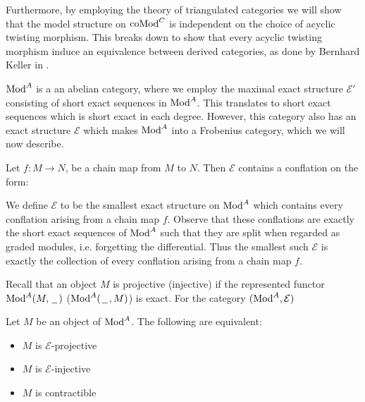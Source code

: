 \documentclass[../thesis.tex]{subfiles}
\begin{document}
            Furthermore, by employing the theory of triangulated categories we will show that the model structure on $\tt{coMod}^C$ is independent on the choice of acyclic twisting morphism. This breaks down to show that every acyclic twisting morphism induce an equivalence between derived categories, as done by Bernhard Keller in \cite{Keller94}.

            $\tt{Mod}^A$ is a an abelian category, where we employ the maximal exact structure $\mathcal{E}'$ consisting of short exact sequences in $\tt{Mod}^A$. This translates to short exact sequences which is short exact in each degree. However, this category also has an exact structure $\mathcal{E}$ which makes $\tt{Mod}^A$ into a Frobenius category, which we will now describe.

            Let $f : M \rightarrow N$, be a chain map from $M$ to $N$. Then $\mathcal{E}$ contains a conflation on the form:
            \begin{center}
            \end{center}
            We define $\mathcal{E}$ to be the smallest exact structure on $\tt{Mod}^A$ which contains every conflation arising from a chain map $f$. Observe that these conflations are exactly the short exact sequences of $\tt{Mod}^A$ such that they are split when regarded as graded modules, i.e. forgetting the differential. Thus the smallest such $\mathcal{E}$ is exactly the collection of every conflation arising from a chain map $f$.

            Recall that an object $M$ is projective (injective) if the represented functor $\tt{Mod}^A(M,\argument)$ ($\tt{Mod}^A(\argument,M)$) is exact. For the category $(\tt{Mod}^A, \mathcal{E})$

            \begin{proposition}
                Let $M$ be an object of $\tt{Mod}^A$. The following are equivalent:
                \begin{itemize}
                    \item $M$ is $\mathcal{E}$-projective
                    \item $M$ is $\mathcal{E}$-injective
                    \item $M$ is contractible
                \end{itemize}
            \end{proposition}
\end{document}

